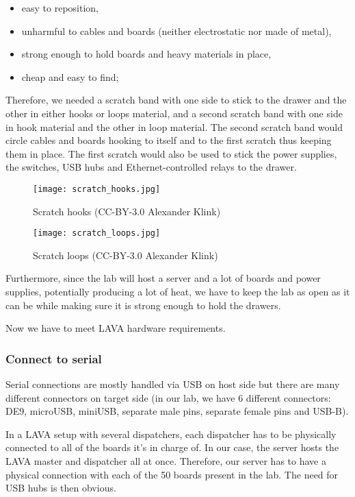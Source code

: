 \begin{itemize}
  \item easy to reposition,
  \item unharmful to cables and boards (neither electrostatic nor made of metal),
  \item strong enough to hold boards and heavy materials in place,
  \item cheap and easy to find;
\end{itemize}

Therefore, we needed a scratch band with one side to stick to the drawer and the other in either hooks or loops material, and a second scratch band with one side in hook material and the other in loop material. The second scratch band would circle cables and boards hooking to itself and to the first scratch thus keeping them in place. The first scratch would also be used to stick the power supplies, the switches, USB hubs and Ethernet-controlled relays to the drawer.

\begin{figure}[H]
  \centering
  \begin{minipage}[b]{0.45\textwidth}
    \texttt{[image: scratch\_hooks.jpg]}
    \caption{Scratch hooks (CC-BY-3.0 Alexander Klink)}
  \end{minipage}
  \hfill
  \begin{minipage}[b]{0.45\textwidth}
    \texttt{[image: scratch\_loops.jpg]}
    \caption{Scratch loops (CC-BY-3.0 Alexander Klink)}
  \end{minipage}
\end{figure}

Furthermore, since the lab will host a server and a lot of boards and power supplies, potentially producing a lot of heat, we have to keep the lab as open as it can be while making sure it is strong enough to hold the drawers.

Now we have to meet LAVA hardware requirements.

\subsubsection{Connect to serial}

Serial connections are mostly handled via USB on host side but there are many different connectors on target side (in our lab, we have 6 different connectors: DE9, microUSB, miniUSB, separate male pins, separate female pins and USB-B).

In a LAVA setup with several dispatchers, each dispatcher has to be physically connected to all of the boards it's in charge of. In our case, the server hosts the LAVA master and dispatcher all at once. Therefore, our server has to have a physical connection with each of the 50 boards present in the lab. The need for USB hubs is then obvious.

